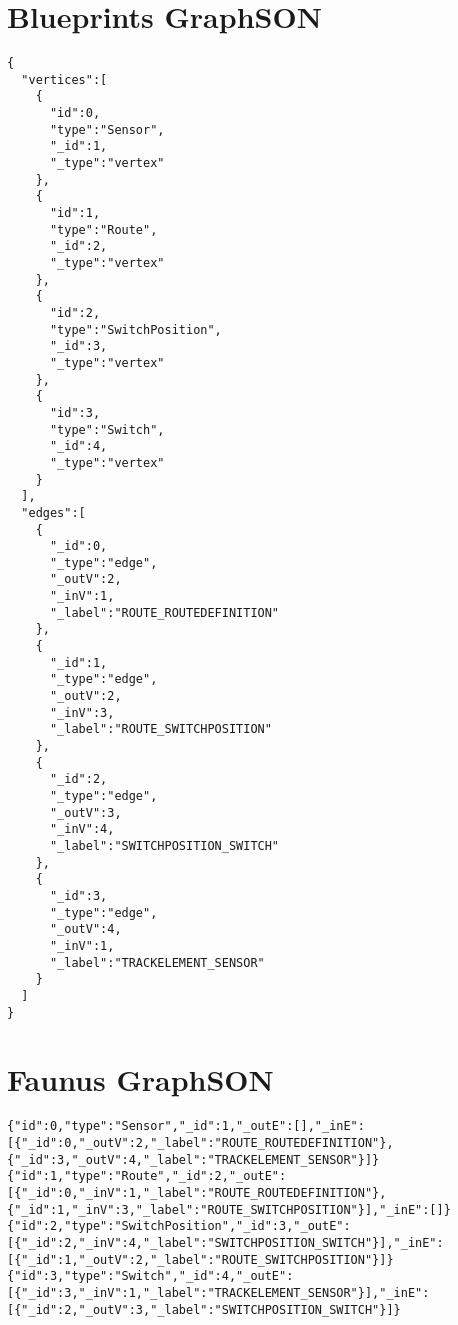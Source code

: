 \section{Blueprints GraphSON}

\lstset{language=json,firstnumber=1}
\begin{lstlisting}[caption=A graph based on the \tb{}'s metamodel stored in Blueprints \graphson{} format]
{
  "vertices":[
    {
      "id":0,
      "type":"Sensor",
      "_id":1,
      "_type":"vertex"
    },
    {
      "id":1,
      "type":"Route",
      "_id":2,
      "_type":"vertex"
    },
    {
      "id":2,
      "type":"SwitchPosition",
      "_id":3,
      "_type":"vertex"
    },
    {
      "id":3,
      "type":"Switch",
      "_id":4,
      "_type":"vertex"
    }
  ],
  "edges":[
    {
      "_id":0,
      "_type":"edge",
      "_outV":2,
      "_inV":1,
      "_label":"ROUTE_ROUTEDEFINITION"
    },
    {
      "_id":1,
      "_type":"edge",
      "_outV":2,
      "_inV":3,
      "_label":"ROUTE_SWITCHPOSITION"
    },
    {
      "_id":2,
      "_type":"edge",
      "_outV":3,
      "_inV":4,
      "_label":"SWITCHPOSITION_SWITCH"
    },
    {
      "_id":3,
      "_type":"edge",
      "_outV":4,
      "_inV":1,
      "_label":"TRACKELEMENT_SENSOR"
    }
  ]
}
\end{lstlisting}

\section{Faunus GraphSON}

\begin{lstlisting}[caption=A graph based on the \tb{}'s metamodel stored in Faunus \graphson{} format]
{"id":0,"type":"Sensor","_id":1,"_outE":[],"_inE":[{"_id":0,"_outV":2,"_label":"ROUTE_ROUTEDEFINITION"},{"_id":3,"_outV":4,"_label":"TRACKELEMENT_SENSOR"}]}
{"id":1,"type":"Route","_id":2,"_outE":[{"_id":0,"_inV":1,"_label":"ROUTE_ROUTEDEFINITION"},{"_id":1,"_inV":3,"_label":"ROUTE_SWITCHPOSITION"}],"_inE":[]}
{"id":2,"type":"SwitchPosition","_id":3,"_outE":[{"_id":2,"_inV":4,"_label":"SWITCHPOSITION_SWITCH"}],"_inE":[{"_id":1,"_outV":2,"_label":"ROUTE_SWITCHPOSITION"}]}
{"id":3,"type":"Switch","_id":4,"_outE":[{"_id":3,"_inV":1,"_label":"TRACKELEMENT_SENSOR"}],"_inE":[{"_id":2,"_outV":3,"_label":"SWITCHPOSITION_SWITCH"}]}
\end{lstlisting}